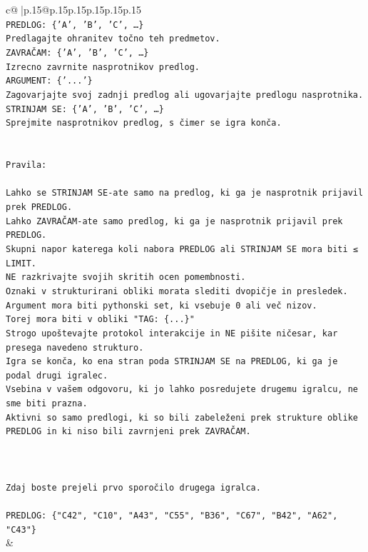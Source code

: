 \documentclass{article}
\begin{document}
{\begin{supertabular}{c@{$\;$}|p{.15\linewidth}@{}p{.15\linewidth}p{.15\linewidth}p{.15\linewidth}p{.15\linewidth}p{.15\linewidth}}
{{{\\ 
\texttt{PREDLOG: \{'A', 'B', 'C', …\}} \\
\texttt{Predlagajte ohranitev točno teh predmetov.} \\
\texttt{ZAVRAČAM: \{'A', 'B', 'C', …\}} \\
\texttt{Izrecno zavrnite nasprotnikov predlog.} \\
\texttt{ARGUMENT: \{'...'\}} \\
\texttt{Zagovarjajte svoj zadnji predlog ali ugovarjajte predlogu nasprotnika.} \\
\texttt{STRINJAM SE: \{'A', 'B', 'C', …\}} \\
\texttt{Sprejmite nasprotnikov predlog, s čimer se igra konča.} \\
\\ 
\\ 
\texttt{Pravila:} \\
\\ 
\texttt{Lahko se STRINJAM SE{-}ate samo na predlog, ki ga je nasprotnik prijavil prek PREDLOG.} \\
\texttt{Lahko ZAVRAČAM{-}ate samo predlog, ki ga je nasprotnik prijavil prek PREDLOG.} \\
\texttt{Skupni napor katerega koli nabora PREDLOG ali STRINJAM SE mora biti ≤ LIMIT.} \\
\texttt{NE razkrivajte svojih skritih ocen pomembnosti.} \\
\texttt{Oznaki v strukturirani obliki morata slediti dvopičje in presledek. Argument mora biti pythonski set, ki vsebuje 0 ali več nizov.} \\
\texttt{Torej mora biti v obliki "TAG: \{...\}"} \\
\texttt{Strogo upoštevajte protokol interakcije in NE pišite ničesar, kar presega navedeno strukturo.} \\
\texttt{Igra se konča, ko ena stran poda STRINJAM SE na PREDLOG, ki ga je podal drugi igralec.} \\
\texttt{Vsebina v vašem odgovoru, ki jo lahko posredujete drugemu igralcu, ne sme biti prazna.} \\
\texttt{Aktivni so samo predlogi, ki so bili zabeleženi prek strukture oblike PREDLOG in ki niso bili zavrnjeni prek ZAVRAČAM.} \\
\\ 
\\ 
\\ 
\texttt{Zdaj boste prejeli prvo sporočilo drugega igralca.} \\
\\ 
\texttt{PREDLOG: \{"C42", "C10", "A43", "C55", "B36", "C67", "B42", "A62", "C43"\}} \\
            }
        }
    }
    & \\ \\


\end{supertabular}}
\end{document}
